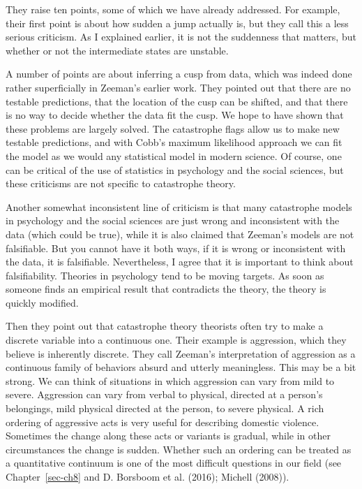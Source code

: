 \documentclass[
  a4paper,
  DIV=11,
  numbers=noendperiod,
  oneside]{scrreprt}
\begin{document}
They raise ten points, some of which we have already addressed. For
example, their first point is about how sudden a jump actually is, but
they call this a less serious criticism. As I explained earlier, it is
not the suddenness that matters, but whether or not the intermediate
states are unstable.

A number of points are about inferring a cusp from data, which was
indeed done rather superficially in Zeeman's earlier work. They pointed
out that there are no testable predictions, that the location of the
cusp can be shifted, and that there is no way to decide whether the data
fit the cusp. We hope to have shown that these problems are largely
solved. The catastrophe flags allow us to make new testable predictions,
and with Cobb's maximum likelihood approach we can fit the model as we
would any statistical model in modern science. Of course, one can be
critical of the use of statistics in psychology and the social sciences,
but these criticisms are not specific to catastrophe theory.

Another somewhat inconsistent line of criticism is that many catastrophe
models in psychology and the social sciences are just wrong and
inconsistent with the data (which could be true), while it is also
claimed that Zeeman's models are not falsifiable. But you cannot have it
both ways, if it is wrong or inconsistent with the data, it is
falsifiable. Nevertheless, I agree that it is important to think about
falsifiability. Theories in psychology tend to be moving targets. As
soon as someone finds an empirical result that contradicts the theory,
the theory is quickly modified.

Then they point out that catastrophe theory theorists often try to make
a discrete variable into a continuous one. Their example is aggression,
which they believe is inherently discrete. They call Zeeman's
interpretation of aggression as a continuous family of behaviors absurd
and utterly meaningless. This may be a bit strong. We can think of
situations in which aggression can vary from mild to severe. Aggression
can vary from verbal to physical, directed at a person's belongings,
mild physical directed at the person, to severe physical. A rich
ordering of aggressive acts is very useful for describing domestic
violence. Sometimes the change along these acts or variants is gradual,
while in other circumstances the change is sudden. Whether such an
ordering can be treated as a quantitative continuum is one of the most
difficult questions in our field (see Chapter~\ref{sec-ch8} and D.
Borsboom et al. (2016); Michell (2008)).
\end{document}
